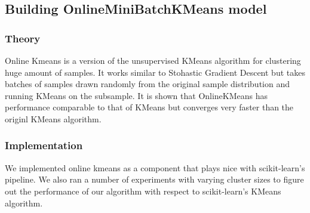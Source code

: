 \documentclass[final,leqno,onefignum,onetabnum]{siamltexmm}
\begin{document}
\subsection{Building OnlineMiniBatchKMeans model}
\subsubsection{Theory}
Online Kmeans is a version of the unsupervised KMeans algorithm for clustering huge amount of samples\cite{art:online_kmeans}.  It works similar to Stohastic Gradient Descent but takes batches of samples drawn randomly from the original sample distribution and running KMeans on the subsample.
It is shown that OnlineKMeans has performance comparable to that of KMeans but converges very faster than the originl KMeans algorithm.
\subsubsection{Implementation}
We implemented online kmeans as a component that plays nice with scikit-learn's pipeline.  We also ran a number of experiments with varying cluster sizes to figure out the performance of our algorithm with respect to scikit-learn's KMeans algorithm.
\end{document}
